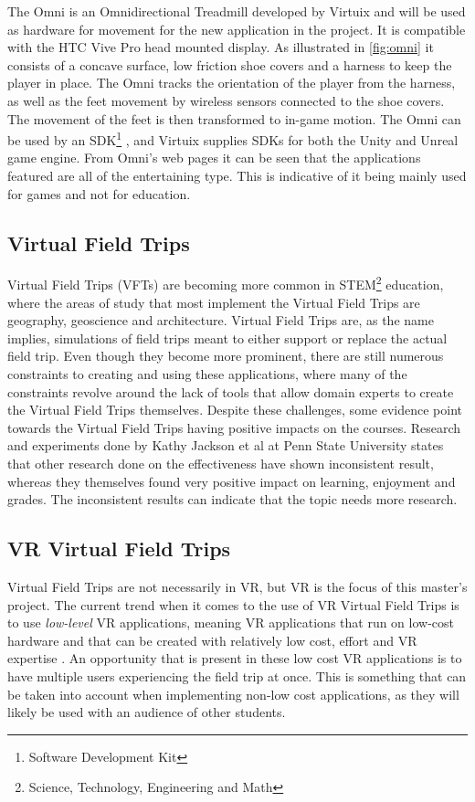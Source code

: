             The Omni is an Omnidirectional Treadmill developed by Virtuix \cite{omni} and will be used as hardware for movement for the new application in the project. It is compatible with the HTC Vive Pro head mounted display. As illustrated in \cref{fig:omni} it consists of a concave surface, low friction shoe covers and a harness to keep the player in place. The Omni tracks the orientation of the player from the harness, as well as the feet movement by wireless sensors connected to the shoe covers. The movement of the feet is then transformed to in-game motion. The Omni can be used by an SDK\footnote{Software Development Kit} \cite{omni_sdk}, and Virtuix supplies SDKs for both the Unity and Unreal game engine. From Omni's web pages it can be seen that the applications featured are all of the entertaining type. This is indicative of it being mainly used for games and not for education.
    
    \subsection{Virtual Field Trips}
        Virtual Field Trips (VFTs) are becoming more common in STEM\footnote{Science, Technology, Engineering and Math} education, where the areas of study that most implement the Virtual Field Trips are geography, geoscience and architecture. Virtual Field Trips are, as the name implies, simulations of field trips meant to either support or replace the actual field trip. Even though they become more prominent, there are still numerous constraints to creating and using these applications, where many of the constraints revolve around the lack of tools that allow domain experts to create the Virtual Field Trips themselves\cite{vft_geoscience}. Despite these challenges, some evidence point towards the Virtual Field Trips having positive impacts on the courses. Research and experiments done by Kathy Jackson et al \cite{ivft_effectiveness} at Penn State University states that other research done on the effectiveness have shown inconsistent result, whereas they themselves found very positive impact on learning, enjoyment and grades. The inconsistent results can indicate that the topic needs more research.
    
    \subsection{VR Virtual Field Trips}
        Virtual Field Trips are not necessarily in VR, but VR is the focus of this master's project. The current trend when it comes to the use of VR Virtual Field Trips is to use \emph{low-level} VR applications, meaning VR applications that run on low-cost hardware and that can be created with relatively low cost, effort and VR expertise \cite{vr_low_cost}. An opportunity that is present in these low cost VR applications is to have multiple users experiencing the field trip at once. This is something that can be taken into account when implementing non-low cost applications, as they will likely be used with an audience of other students.
    
